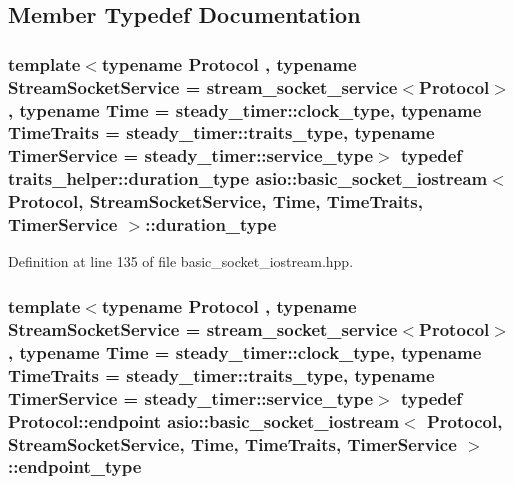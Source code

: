 \subsection{Member Typedef Documentation}
\hypertarget{classasio_1_1basic__socket__iostream_af9d3e684e0709c574a1d92f7013e1b36}{}
\subsubsection[{duration\+\_\+type}]{\setlength{\rightskip}{0pt plus 5cm}template$<$typename Protocol , typename Stream\+Socket\+Service  = stream\+\_\+socket\+\_\+service$<$\+Protocol$>$, typename Time  = steady\+\_\+timer\+::clock\+\_\+type, typename Time\+Traits  = steady\+\_\+timer\+::traits\+\_\+type, typename Timer\+Service  = steady\+\_\+timer\+::service\+\_\+type$>$ typedef {\bf traits\+\_\+helper\+::duration\+\_\+type} {\bf asio\+::basic\+\_\+socket\+\_\+iostream}$<$ Protocol, Stream\+Socket\+Service, Time, Time\+Traits, Timer\+Service $>$\+::{\bf duration\+\_\+type}}\label{classasio_1_1basic__socket__iostream_af9d3e684e0709c574a1d92f7013e1b36}


Definition at line 135 of file basic\+\_\+socket\+\_\+iostream.\+hpp.

\hypertarget{classasio_1_1basic__socket__iostream_a7c5f21f11ac0d35b00935ba750b8ed4d}{}
\subsubsection[{endpoint\+\_\+type}]{\setlength{\rightskip}{0pt plus 5cm}template$<$typename Protocol , typename Stream\+Socket\+Service  = stream\+\_\+socket\+\_\+service$<$\+Protocol$>$, typename Time  = steady\+\_\+timer\+::clock\+\_\+type, typename Time\+Traits  = steady\+\_\+timer\+::traits\+\_\+type, typename Timer\+Service  = steady\+\_\+timer\+::service\+\_\+type$>$ typedef Protocol\+::endpoint {\bf asio\+::basic\+\_\+socket\+\_\+iostream}$<$ Protocol, Stream\+Socket\+Service, Time, Time\+Traits, Timer\+Service $>$\+::{\bf endpoint\+\_\+type}}\label{classasio_1_1basic__socket__iostream_a7c5f21f11ac0d35b00935ba750b8ed4d}


